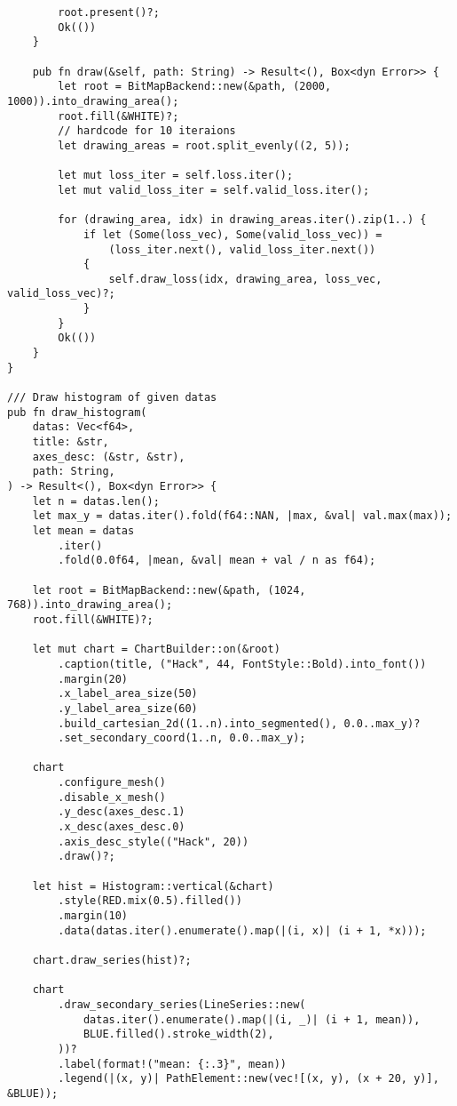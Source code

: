 \begin{verbatim}
        root.present()?;
        Ok(())
    }

    pub fn draw(&self, path: String) -> Result<(), Box<dyn Error>> {
        let root = BitMapBackend::new(&path, (2000, 1000)).into_drawing_area();
        root.fill(&WHITE)?;
        // hardcode for 10 iteraions
        let drawing_areas = root.split_evenly((2, 5));

        let mut loss_iter = self.loss.iter();
        let mut valid_loss_iter = self.valid_loss.iter();

        for (drawing_area, idx) in drawing_areas.iter().zip(1..) {
            if let (Some(loss_vec), Some(valid_loss_vec)) =
                (loss_iter.next(), valid_loss_iter.next())
            {
                self.draw_loss(idx, drawing_area, loss_vec, valid_loss_vec)?;
            }
        }
        Ok(())
    }
}

/// Draw histogram of given datas
pub fn draw_histogram(
    datas: Vec<f64>,
    title: &str,
    axes_desc: (&str, &str),
    path: String,
) -> Result<(), Box<dyn Error>> {
    let n = datas.len();
    let max_y = datas.iter().fold(f64::NAN, |max, &val| val.max(max));
    let mean = datas
        .iter()
        .fold(0.0f64, |mean, &val| mean + val / n as f64);

    let root = BitMapBackend::new(&path, (1024, 768)).into_drawing_area();
    root.fill(&WHITE)?;

    let mut chart = ChartBuilder::on(&root)
        .caption(title, ("Hack", 44, FontStyle::Bold).into_font())
        .margin(20)
        .x_label_area_size(50)
        .y_label_area_size(60)
        .build_cartesian_2d((1..n).into_segmented(), 0.0..max_y)?
        .set_secondary_coord(1..n, 0.0..max_y);

    chart
        .configure_mesh()
        .disable_x_mesh()
        .y_desc(axes_desc.1)
        .x_desc(axes_desc.0)
        .axis_desc_style(("Hack", 20))
        .draw()?;

    let hist = Histogram::vertical(&chart)
        .style(RED.mix(0.5).filled())
        .margin(10)
        .data(datas.iter().enumerate().map(|(i, x)| (i + 1, *x)));

    chart.draw_series(hist)?;

    chart
        .draw_secondary_series(LineSeries::new(
            datas.iter().enumerate().map(|(i, _)| (i + 1, mean)),
            BLUE.filled().stroke_width(2),
        ))?
        .label(format!("mean: {:.3}", mean))
        .legend(|(x, y)| PathElement::new(vec![(x, y), (x + 20, y)], &BLUE));


\end{verbatim}
